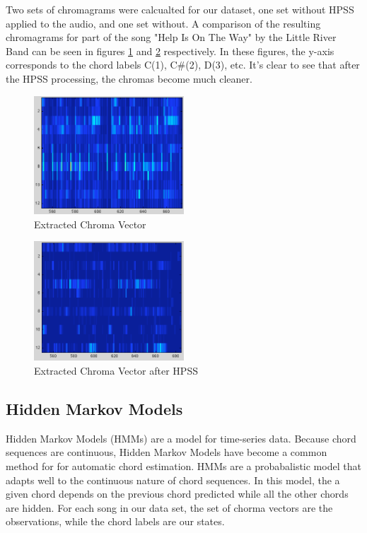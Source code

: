 \documentclass{article}
\begin{document}
Two sets of chromagrams were calcualted for our dataset, one set without HPSS
applied to the audio, and one set without. A comparison of the resulting
chromagrams for part of the song "Help Is On The Way" by the Little River Band
can be seen in figures \ref{fig:ChromaNorm} and \ref{fig:ChromaHPSS}
respectively. In these figures, the y-axis corresponds to the chord labels
C(1), C\#(2), D(3), etc. It's clear to see that after the HPSS processing, the
chromas become much cleaner.

\begin{figure}
	\centering
	\includegraphics[width=0.5\textwidth]{187.png}
	\caption{Extracted Chroma Vector}
	\label{fig:ChromaNorm}
\end{figure}

\begin{figure}
	\centering
	\includegraphics[width=0.5\textwidth]{187h.png}
	\caption{Extracted Chroma Vector after HPSS}
	\label{fig:ChromaHPSS}
\end{figure}

\subsection{Hidden Markov Models}

Hidden Markov Models (HMMs) are a model for time-series data. Because chord sequences are continuous,  Hidden Markov Models have become a common method for for automatic chord estimation. HMMs are a probabalistic
model that adapts well to the continuous nature of chord sequences. In this model, the a given chord depends on the previous chord predicted while all the other chords are hidden. For each song in our data set, the set of chorma vectors are the observations, while the chord labels are our states.
\end{document}
